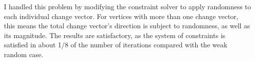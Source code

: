 I handled this problem by modifying the constraint solver to apply
randomness to each individual change vector. For vertices with more
than one change vector, this means the total change vector's direction
is subject to randomness, as well as its magnitude. The results are
satisfactory, as the system of constraints is satisfied in about 1/8
of the number of iterations compared with the weak random case.

